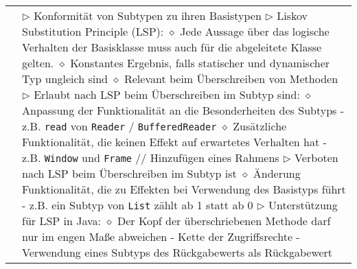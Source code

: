 \begin{longtable}{ | p{} p{} | }
	\makecell[l]{Konformität} & \makecell[l]{
	$\rhd$  Konformität von Subtypen zu ihren Basistypen \\
	$\rhd$ Liskov Substitution Principle (LSP): \\
	\hspace{0.4cm} $\diamond$ Jede Aussage über das logische Verhalten der Basisklasse muss \\
	\hspace{0.8cm} auch für die abgeleitete Klasse gelten. \\
	\hspace{0.4cm} $\diamond$ Konstantes Ergebnis, falls statischer und dynamischer Typ ungleich sind \\
	\hspace{0.4cm} $\diamond$ Relevant beim Überschreiben von Methoden \\
	$\rhd$ Erlaubt nach LSP beim Überschreiben im Subtyp sind: \\
	\hspace{0.4cm} $\diamond$ Anpassung der Funktionalität an die Besonderheiten des Subtyps \\
	\hspace{0.6cm} - z.B. \texttt{read} von \texttt{Reader} / \texttt{BufferedReader} \\
	\hspace{0.4cm} $\diamond$ Zusätzliche Funktionalität, die keinen Effekt auf erwartetes Verhalten hat \\ 
	\hspace{0.6cm} - z.B. \texttt{Window} und \texttt{Frame} // Hinzufügen eines Rahmens \\
	$\rhd$ Verboten nach LSP beim Überschreiben im Subtyp ist \\
	\hspace{0.4cm} $\diamond$ Änderung Funktionalität, die zu Effekten bei Verwendung des Basistyps führt \\
	\hspace{0.6cm} - z.B. ein Subtyp von \texttt{List} zählt ab 1 statt ab 0 \\
	$\rhd$ Unterstützung für LSP in Java: \\
	\hspace{0.4cm} $\diamond$ Der Kopf der überschriebenen Methode darf nur im engen Ma\ss e abweichen \\
	\hspace{0.6cm} - Kette der Zugriffsrechte \\
	\hspace{0.6cm} - Verwendung eines Subtyps des Rückgabewerts als Rückgabewert \\
}
\end{longtable}

